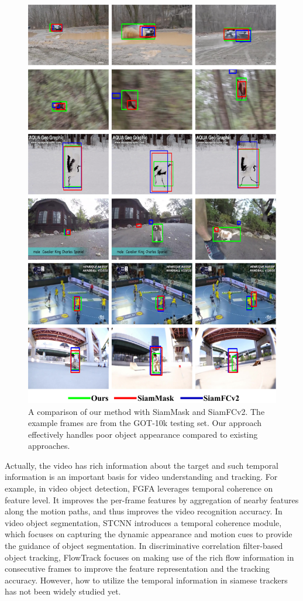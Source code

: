\begin{figure}[t]
    \centering
    \includegraphics[width=1.0\textwidth]{Img/end/visulization.pdf}
    \caption{A comparison of our method with SiamMask and SiamFCv2. The example frames are from the GOT-10k testing set. Our approach effectively handles poor object appearance compared to existing approaches.}
    \label{fig:visulization}
\end{figure}

Actually, the video has rich information about the target and such temporal information is an important basis for video understanding and tracking.
For example, in video object detection, FGFA \cite{zhu2017flow} leverages temporal coherence on feature level. It improves the per-frame features by aggregation of nearby features along the motion paths, and thus improves the video recognition accuracy.
In video object segmentation, STCNN \cite{xu2019spatiotemporal} introduces a temporal coherence module, which focuses on capturing the dynamic appearance and motion cues to provide the guidance of object segmentation.
In discriminative correlation filter-based object tracking, FlowTrack \cite{FlowTrack} focuses on making use of the rich flow information in consecutive frames to improve the feature representation and the tracking accuracy. 
However, how to utilize the temporal information in siamese trackers has not been widely studied yet. 

